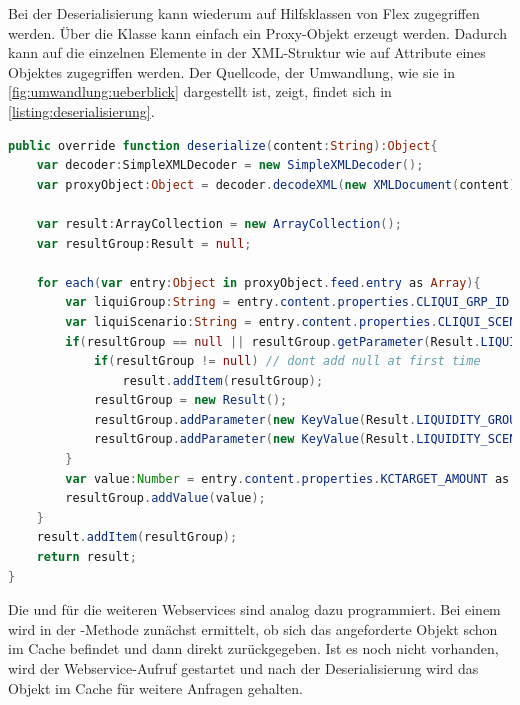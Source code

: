 \begin{onehalfspacing}
Bei der Deserialisierung kann wiederum auf Hilfsklassen von Flex zugegriffen werden. Über die Klasse  kann einfach ein Proxy-Objekt erzeugt werden. Dadurch kann auf die einzelnen Elemente in der \gls{XML}-Struktur wie auf Attribute eines Objektes zugegriffen werden. Der Quellcode, der Umwandlung, wie sie in \vref{fig:umwandlung:ueberblick} dargestellt ist, zeigt, findet sich in \vref{listing:deserialisierung}.

\begin{programm}[h] %
\begin{lstlisting}[language=ActionScript]
public override function deserialize(content:String):Object{			
	var decoder:SimpleXMLDecoder = new SimpleXMLDecoder();
	var proxyObject:Object = decoder.decodeXML(new XMLDocument(content));
	
	var result:ArrayCollection = new ArrayCollection();
	var resultGroup:Result = null;			
			
	for each(var entry:Object in proxyObject.feed.entry as Array){
		var liquiGroup:String = entry.content.properties.CLIQUI_GRP_ID as String;
		var liquiScenario:String = entry.content.properties.CLIQUI_SCENARIO as String;
		if(resultGroup == null || resultGroup.getParameter(Result.LIQUIDITY_GROUP) != liquiGroup || resultGroup.getParameter(Result.LIQUIDITY_SCENARIO) != liquiScenario){
			if(resultGroup != null) // dont add null at first time
				result.addItem(resultGroup);
			resultGroup = new Result();
			resultGroup.addParameter(new KeyValue(Result.LIQUIDITY_GROUP,liquiGroup));
			resultGroup.addParameter(new KeyValue(Result.LIQUIDITY_SCENARIO,liquiScenario));
		}
		var value:Number = entry.content.properties.KCTARGET_AMOUNT as Number;
		resultGroup.addValue(value);
	}
	result.addItem(resultGroup);
	return result;
}
\end{lstlisting}
\caption{Deserialisierung des XML-Format in die interne Objektstruktur\label{listing:deserialisierung}}
\end{programm}

Die  und  für die weiteren Webservices sind analog dazu programmiert. Bei einem  wird in der -Methode zunächst ermittelt, ob sich das angeforderte Objekt schon im Cache befindet und dann direkt zurückgegeben. Ist es noch nicht vorhanden, wird der Webservice-Aufruf gestartet und nach der Deserialisierung wird das Objekt im Cache für weitere Anfragen gehalten.


\end{onehalfspacing}
